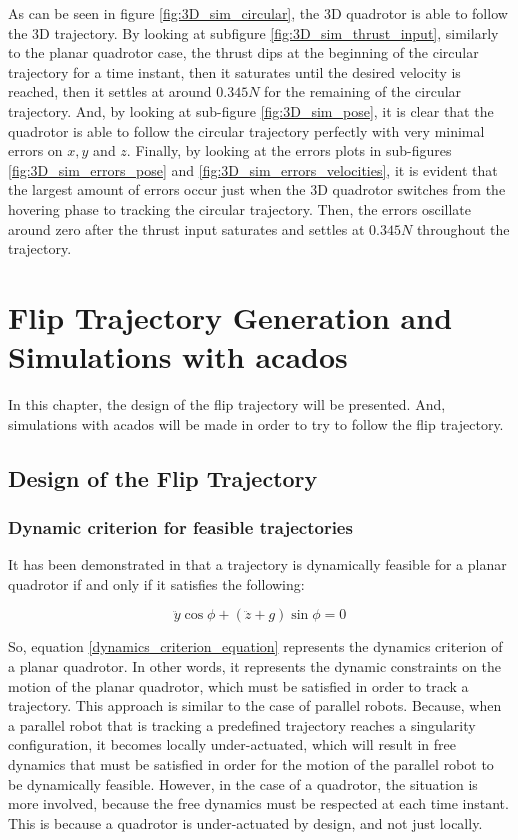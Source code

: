 \documentclass{thesisreport}
\begin{document}
\newpage 

As can be seen in figure \ref{fig:3D_sim_circular}, the 3D quadrotor is able to follow the 3D trajectory. By looking at subfigure \ref{fig:3D_sim_thrust_input}, similarly to the planar quadrotor case, the thrust dips at the beginning of the circular trajectory for a time instant, then it saturates until the desired velocity is reached, then it settles at around $0.345N$ for the remaining of the circular trajectory. And, by looking at sub-figure \ref{fig:3D_sim_pose}, it is clear that the quadrotor is able to follow the circular trajectory perfectly with very minimal errors on $x,y$ and $z$. Finally, by looking at the errors plots in sub-figures \ref{fig:3D_sim_errors_pose} and \ref{fig:3D_sim_errors_velocities}, it is evident that the largest amount of errors occur just when the 3D quadrotor switches from the hovering phase to tracking the circular trajectory. Then, the errors oscillate around zero after the thrust input saturates and settles at $0.345N$ throughout the trajectory.

\newpage

\chapter{Flip Trajectory Generation and Simulations with acados}
In this chapter, the design of the flip trajectory will be presented. And, simulations with acados will be made in order to try to follow the flip trajectory.

\section{Design of the Flip Trajectory}

\subsection{Dynamic criterion for feasible trajectories}

	It has been demonstrated in \cite{Orsingher2019} that a trajectory is dynamically feasible for a planar quadrotor if and only if it satisfies the following:
	
	\begin{equation}\label{dynamics_criterion_equation}
	\ddot{y} \cos \phi + (\ddot{z} + g) \sin \phi = 0
	\end{equation}

So, equation \ref{dynamics_criterion_equation} represents the dynamics criterion of a planar quadrotor. In other words, it represents the dynamic constraints on the motion of the planar quadrotor, which must be satisfied in order to track a trajectory. This approach is similar to the case of parallel robots. Because, when a parallel robot that is tracking a predefined trajectory reaches a singularity configuration, it becomes locally under-actuated, which will result in free dynamics that must be satisfied in order for the motion of the parallel robot to be dynamically feasible. However, in the case of a quadrotor, the situation is more involved, because the free dynamics must be respected at each time instant. This is because a quadrotor is under-actuated by design, and not just locally. 
\end{document}
